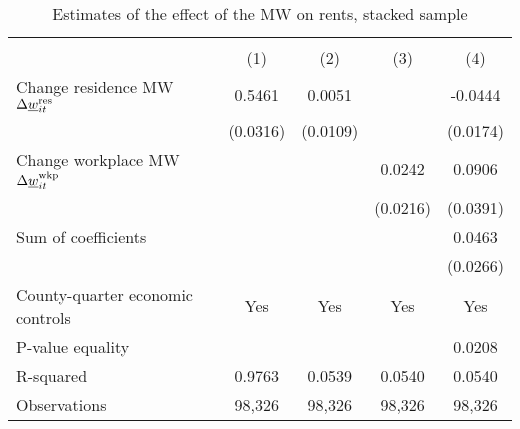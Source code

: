 \begin{table}[hbt!] \centering
    \caption{Estimates of the effect of the MW on rents, stacked sample}
    \label{tab:stacked_w6}
    \begin{tabular}{l*{4}{c}}
        \toprule
        & 
            &  \\ \cmidrule(lr){2-2}\cmidrule(lr){3-5}
                                            & (1)   & (2)   & (3)   & (4)            \\ \midrule
        Change residence MW 
                    $\Delta\underline{w}_{it}^{\text{res}}$  &  0.5461  &  0.0051  &       &  -0.0444     \\
                                            & (0.0316) & (0.0109) &       & (0.0174)    \\
        Change workplace MW 
                    $\Delta\underline{w}_{it}^{\text{wkp}}$ &       &       &  0.0242  & 0.0906      \\
                                            &       &       & (0.0216) & (0.0391)    \\ \midrule
        Sum of coefficients                &       &       &       &  0.0463     \\
                                            &       &       &       & (0.0266)    \\ \midrule
        County-quarter economic controls   &  Yes  & Yes   & Yes   & Yes      \\
        P-value equality                   &       &       &       & 0.0208      \\
        R-squared                          &  0.9763  &  0.0539  &  0.0540  & 0.0540      \\
        Observations                       & 98,326  & 98,326  & 98,326  & 98,326     \\\bottomrule
    \end{tabular}


\end{table}
